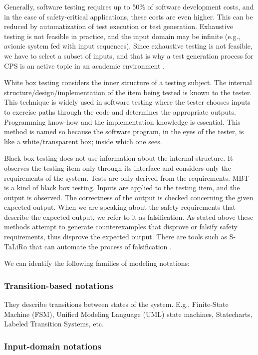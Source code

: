 Generally, software testing requires up to 50\% of software development costs, and in the case of safety-critical applications, these costs are even higher. This can be reduced by automatization of test execution or test generation. Exhaustive testing is not feasible in practice, and the input domain may be infinite (e.g., avionic system fed with input sequences). Since exhaustive testing is not feasible, we have to select a subset of inputs, and that is why a test generation process for CPS is an active topic in an academic environment \cite{Ratschan:AutomaticAnalysisCPS}.

White box testing considers the inner structure of a testing subject. The internal structure/design/implementation of the item being tested is known to the tester. This technique is widely used in software testing where the tester chooses inputs to exercise paths through the code and determines the appropriate outputs. Programming know-how and the implementation knowledge is essential. This method is named so because the software program, in the eyes of the tester, is like a white/transparent box; inside which one sees.

Black box testing does not use information about the internal structure. It observes the testing item only through its interface and considers only the requirements of the system. Tests are only derived from the requirements. MBT is a kind of black box testing. Inputs are applied to the testing item, and the output is observed. The correctness of the output is checked concerning the given expected output. When we are speaking about the safety requirements that describe the expected output, we refer to it as falsification. As stated above these methods attempt to generate counterexamples that disprove or falsify safety requirements, thus disprove the expected output. There are tools such as S-TaLiRo that can automate the process of falsification \cite{Fainekos:sTaLiRo}.

We can identify the following families of modeling notations:

\subsubsection{Transition-based notations}

They describe transitions between states of the system. E.g., Finite-State Machine (FSM), Unified Modeling Language (UML) state machines, Statecharts, Labeled Transition Systems, etc.

\subsubsection{Input-domain notations}

